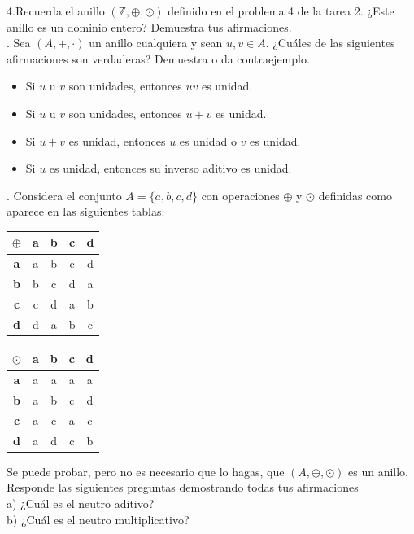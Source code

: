 \documentclass[letterpaper]{article}
\newcommand{\mas}{\oplus}
\newcommand{\por}{\odot}
\newcommand{\Z}{\mathds{Z}}
\renewcommand{\*}{\cdot}
\theoremstyle{definition}
\begin{document}
\noindent4.Recuerda el anillo $ (\Z, \mas, \por) $ definido en el problema 4 de la tarea 2. ¿Este anillo es un dominio entero? Demuestra tus afirmaciones.\\
. Sea $ (A, +, \*) $ un anillo cualquiera y sean $ u, v \in A $. ¿Cuáles de las siguientes afirmaciones son verdaderas? Demuestra o da contraejemplo.
\begin{itemize}
	\item Si $ u $ u $ v $ son unidades, entonces $ uv $ es unidad.
	\item Si $ u $ u $ v $ son unidades, entonces $ u + v $ es unidad.
	\item Si $ u + v $ es unidad, entonces $ u $ es unidad o $ v $ es unidad.
	\item Si $ u $ es unidad, entonces su inverso aditivo es unidad.
\end{itemize}
\newpage
{}. Considera el conjunto $ A = \{ a,b,c,d\} $ con operaciones $ \mas $ y $ \por $ definidas como aparece en las siguientes tablas:
\begin{table}[h]
	\centering
	\begin{tabular}{c|c|c|c|c}
		$ \mas $ & \textbf{a} & \textbf{b} & \textbf{c} & \textbf{d}\\ \hline
		 \textbf{a} & a & b & c & d \\ \hline
		 \textbf{b} & b & c & d & a \\ \hline
		 \textbf{c} & c & d & a & b \\ \hline
		 \textbf{d} & d & a & b & c \\
	\end{tabular}
	\hspace{3cm}
	\begin{tabular}{c|c|c|c|c}
		$ \por $ & \textbf{a} & \textbf{b} & \textbf{c} & \textbf{d}\\ \hline
		 \textbf{a} & a & a & a & a \\ \hline
		 \textbf{b} & a & b & c & d \\ \hline
		 \textbf{c} & a & c & a & c \\ \hline
		 \textbf{d} & a & d & c & b \\
	\end{tabular}
\end{table}
Se puede probar, pero no es necesario que lo hagas, que $ (A, \mas, \por) $ es un anillo. Responde las siguientes preguntas demostrando todas tus afirmaciones\\
a) ¿Cuál es el neutro aditivo?\\
b) ¿Cuál es el neutro multiplicativo?\\
\end{document}
